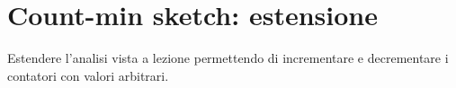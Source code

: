 \chapter{Count-min sketch: estensione}

\begin{problem*}
    Estendere l'analisi vista a lezione permettendo di incrementare e decrementare
    i contatori con valori arbitrari.
\end{problem*}

